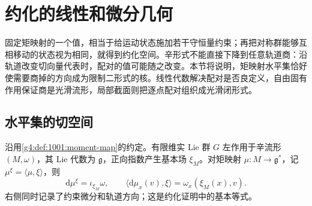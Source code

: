
% 
% 

\section{约化的线性和微分几何}
\label{g4:sec:1002}

固定矩映射的一个值，相当于给运动状态施加若干守恒量约束；再把对称群能够互相移动的状态视为相同，就得到约化空间。辛形式不能直接下降到任意轨道商：沿轨道改变切向量代表时，配对的值可能随之改变。本节将说明，矩映射水平集恰好使需要商掉的方向成为限制二形式的核。线性代数解决配对是否良定义，自由固有作用保证商是光滑流形，局部截面则把逐点配对组织成光滑闭形式。

\subsection{水平集的切空间}
\label{g4:subsec:1002:01}

沿用\cref{g4:def:1001:moment-map}的约定。有限维实 Lie 群 \(G\) 左作用于辛流形 \((M,\omega)\)，其 Lie 代数为 \(\mathfrak g\)，正向指数产生基本场 \(\xi_M\)。对矩映射 \(\mu:M\to\mathfrak g^*\)，记 \(\mu^\xi=\langle\mu,\xi\rangle\)，则
\[
	\mathrm{d}\mu^\xi=\iota_{\xi_M}\omega,
	\qquad
	\langle\mathrm{d}\mu_x(v),\xi\rangle=\omega_x(\xi_M(x),v).
\]
右侧同时记录了约束微分和轨道方向；这是约化证明中的基本等式。

